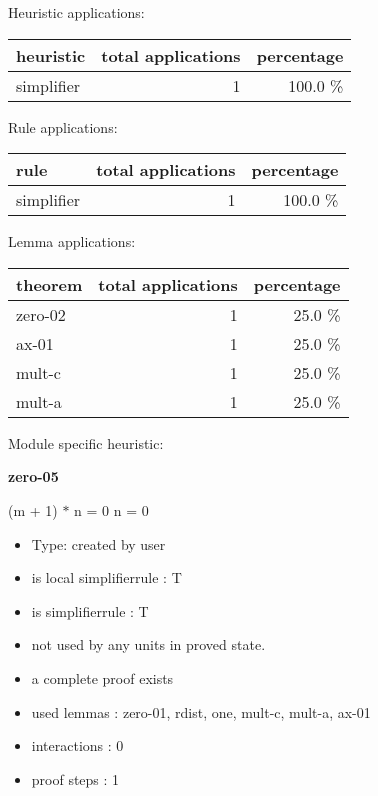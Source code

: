 \documentclass[a4paper]{article}
\begin{document}
\medskip


Heuristic applications:

\begin{supertabular}{l|r|r}
heuristic	& total applications & percentage \\ \hline
simplifier & 1 & 100.0 \% \\

\end{supertabular}

Rule applications:

\begin{supertabular}{l|r|r}
rule	        & total applications & percentage \\ \hline
simplifier & 1 & 100.0 \% \\

\end{supertabular}

Lemma applications:

\begin{supertabular}{l|r|r}
theorem	        & total applications & percentage \\ \hline
zero-02 & 1 & 25.0 \% \\
ax-01 & 1 & 25.0 \% \\
mult-c & 1 & 25.0 \% \\
mult-a & 1 & 25.0 \% \\

\end{supertabular}

Module specific heuristic:

\pagebreak

{\LARGE\bf zero-05}\label{lemma-zero-05}

\medskip

 \Fol (m + 1) $*$ n = 0 \Equiv n = 0

\begin{itemize}

\item Type: created by user

\item is local simplifierrule : T
\item is simplifierrule : T
\item not used by any units in proved state.
\item       a complete proof exists
\item       used lemmas  : zero-01, rdist, one, mult-c, mult-a, ax-01
\item       interactions : 0
\item       proof steps  : 1
\end{itemize}
\end{document}

